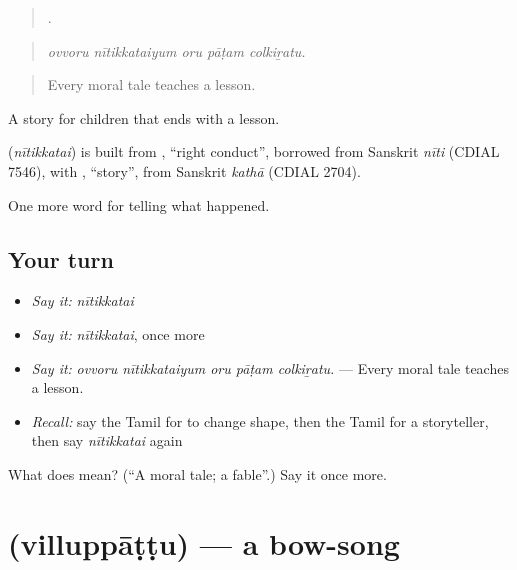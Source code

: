 \begin{quote}
    .
\end{quote}

\begin{quote}
\emph{ovvoru nītikkataiyum oru pāṭam colkiṟatu.}
\end{quote}

\begin{quote}
Every moral tale teaches a lesson.
\end{quote}

A story for children that ends with a lesson.

\begin{cousinweb}
\textbf{} (\emph{nītikkatai}) is built from , \textquotedblleft{}right conduct\textquotedblright{}, borrowed from Sanskrit \emph{nīti} (CDIAL 7546), with , \textquotedblleft{}story\textquotedblright{}, from Sanskrit \emph{kathā} (CDIAL 2704).
\end{cousinweb}

\begin{grammarlens}[title={What you've built}]
One more word for telling what happened.
\end{grammarlens}

\subsection*{Your turn}
\begin{itemize}
\raggedright
  \item \emph{Say it:} \emph{nītikkatai}
  \item \emph{Say it:} \emph{nītikkatai}, once more
  \item \emph{Say it:} \emph{ovvoru nītikkataiyum oru pāṭam colkiṟatu.} — Every moral tale teaches a lesson.
  \item \emph{Recall:} say the Tamil for to change shape, then the Tamil for a storyteller, then say \emph{nītikkatai} again
\end{itemize}

\begin{tcolorbox}[breakable,colback=teal!4,colframe=teal!35!black,title={Before you move on}]
What does  mean? (\textquotedblleft{}A moral tale; a fable\textquotedblright{}.) Say it once more.
\end{tcolorbox}
\section[\texorpdfstring{\ta{வில்லுப்பாட்டு} (villuppāṭṭu)}{வில்லுப்பாட்டு (villuppāṭṭu)}]{ (villuppāṭṭu) — a bow-song}

